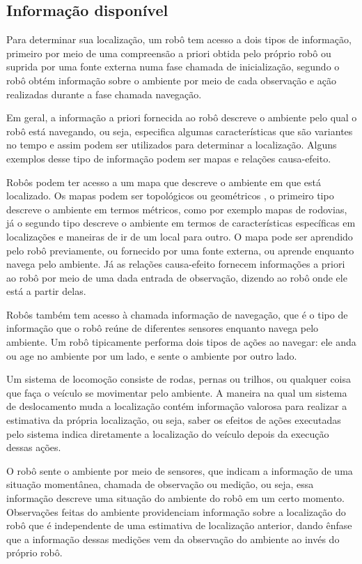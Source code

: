 \documentclass[acronym, symbols, table]{fei}
\begin{document}
		\subsection{Informação disponível}
			
			Para determinar sua localização, um robô tem acesso a dois tipos de informação, primeiro por meio de uma compreensão a priori obtida pelo próprio robô ou suprida por uma fonte externa numa fase chamada de inicialização, segundo o robô obtém informação sobre o ambiente por meio de cada observação e ação realizadas durante a fase chamada navegação. 
			
			Em geral, a informação a priori fornecida ao robô descreve o ambiente pelo qual o robô está navegando, ou seja, especifica algumas características que são variantes no tempo e assim podem ser utilizados para determinar a localização. Alguns exemplos desse tipo de informação podem ser mapas e relações causa-efeito.
			
			Robôs podem ter acesso a um mapa que descreve o ambiente em que está localizado. Os mapas podem ser topológicos ou geométricos \cite{mendes2017perceccao}, o primeiro tipo descreve o ambiente em termos métricos, como por exemplo mapas de rodovias, já o segundo tipo descreve o ambiente em termos de características específicas em localizações e maneiras de ir de um local para outro. O mapa pode ser aprendido pelo robô previamente, ou fornecido por uma fonte externa, ou aprende enquanto navega pelo ambiente. Já as relações causa-efeito fornecem informações a priori ao robô por meio de uma dada entrada de observação, dizendo ao robô onde ele está a partir delas.
			
			Robôs também tem acesso à chamada informação de navegação, que é o tipo de informação que o robô reúne de diferentes sensores enquanto navega pelo ambiente. Um robô tipicamente performa dois tipos de ações ao navegar: ele anda ou age no ambiente por um lado, e sente o ambiente por outro lado.
			
			Um sistema de locomoção consiste de rodas, pernas ou trilhos, ou qualquer coisa que faça o veículo se movimentar pelo ambiente. A maneira na qual um sistema de deslocamento muda a localização contém informação valorosa para realizar a estimativa da própria localização, ou seja, saber os efeitos de ações executadas pelo sistema indica diretamente a localização do veículo depois da execução dessas ações.
			
			O robô sente o ambiente por meio de sensores, que indicam a informação de uma situação momentânea, chamada de observação ou medição, ou seja, essa informação descreve uma situação do ambiente do robô em um certo momento. Observações feitas do ambiente providenciam informação sobre a localização do robô que é independente de uma estimativa de localização anterior, dando ênfase que a informação dessas medições vem da observação do ambiente ao invés do próprio robô.
	
\end{document}
